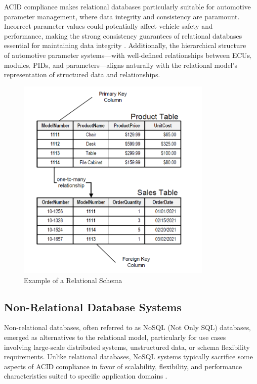 ACID compliance makes relational databases particularly suitable for automotive parameter management, where data integrity and consistency are paramount. Incorrect parameter values could potentially affect vehicle safety and performance, making the strong consistency guarantees of relational databases essential for maintaining data integrity \cite{staron2021automotive}. Additionally, the hierarchical structure of automotive parameter systems—with well-defined relationships between ECUs, modules, PIDs, and parameters—aligns naturally with the relational model's representation of structured data and relationships.

\begin{figure}[ht]
    \centering
    \includegraphics[width=0.85\textwidth]{figures/relational_schema.png}
    \caption{Example of a Relational Schema \cite{noah2024relational}}
    \label{fig:relational-schema}
\end{figure}

\subsection{Non-Relational Database Systems}
\label{subsec:non-relational-database-systems}

Non-relational databases, often referred to as NoSQL (Not Only SQL) databases, emerged as alternatives to the relational model, particularly for use cases involving large-scale distributed systems, unstructured data, or schema flexibility requirements. Unlike relational databases, NoSQL systems typically sacrifice some aspects of ACID compliance in favor of scalability, flexibility, and performance characteristics suited to specific application domains \cite{bhattacherjee2015principles}.


